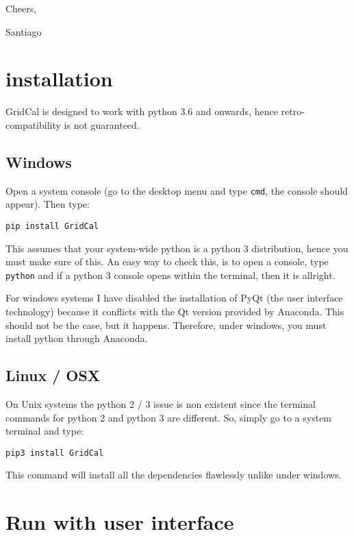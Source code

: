 \documentclass[11pt,fleqn]{book} %
\begin{document}
\begin{flushright}
	Cheers, 

Santiago
\end{flushright}

\newpage
\section{installation}


GridCal is designed to work with python 3.6 and onwards, hence retro-compatibility is not guaranteed.

\subsection{Windows}

Open a system console (go to the desktop menu and type \verb|cmd|, the console should appear). Then type:\newline

\verb|pip install GridCal| \newline

This assumes that your system-wide python is a python 3 distribution, hence you must make sure of this. An easy way to check this, is to open a console, type \verb|python| and if a python 3 console opens within the terminal, then it is allright.

For windows systems I have disabled the installation of PyQt (the user interface technology) because it conflicts with the Qt version provided by Anaconda. This should not be the case, but it happens. Therefore, under windows, you must install python through Anaconda.

\subsection{Linux / OSX}

On Unix systems the python 2 / 3 issue is non existent since the terminal commands for python 2 and python 3 are different. So, simply go to a system terminal and type:\newline

\verb|pip3 install GridCal|  \newline

This command will install all the dependencies flawlessly unlike under windows.


\section{Run with user interface}
\end{document}
